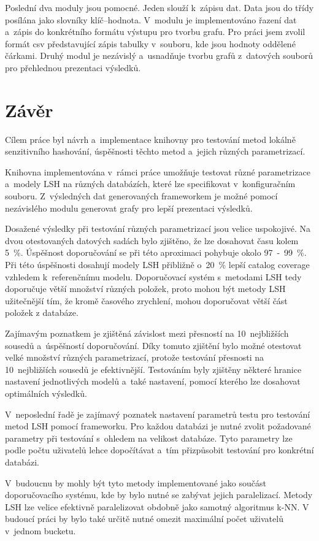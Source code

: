 \documentclass[11pt]{article}
\begin{document}
Poslední dva moduly jsou pomocné. Jeden slouží k~zápisu dat. Data jsou do třídy posílána jako slovníky klíč–hodnota. V~modulu je implementováno řazení dat a~zápis do konkrétního formátu výstupu pro tvorbu grafu. Pro práci jsem zvolil formát csv představující zápis tabulky v~souboru, kde jsou hodnoty oddělené čárkami. Druhý modul je nezávislý a~usnadňuje tvorbu grafů z~datových souborů pro přehlednou prezentaci výsledků.

\section{Závěr}
Cílem práce byl návrh a~implementace knihovny pro testování metod lokálně senzitivního hashování, úspěšnosti těchto metod a~jejich různých parametrizací.
	
	Knihovna implementována v~rámci práce umožňuje testovat různé parametrizace a~modely LSH na různých databázích, které lze specifikovat v~konfiguračním souboru. Z~výsledných dat generovaných frameworkem je možné pomocí nezávislého modulu generovat grafy pro lepší prezentaci výsledků.
	
	Dosažené výsledky při testování různých parametrizací jsou velice uspokojivé. Na dvou otestovaných datových sadách bylo zjištěno, že lze dosahovat času kolem 5~\%. Úspěšnost doporučování se při této aproximaci pohybuje okolo 97~-~99~\%. Při této úspěšnosti dosahují modely LSH přibližně o~20~\% lepší catalog coverage vzhledem k~referenčnímu modelu. Doporučovací systém s~metodami LSH tedy doporučuje větší množství různých položek, proto mohou být metody LSH užitečnější tím, že kromě časového zrychlení, mohou doporučovat větší část položek z databáze.
	
	Zajímavým poznatkem je zjištěná závislost mezi přesností na 10~nejbližších sousedů a~úspěšností doporučování. Díky tomuto zjištění bylo možné otestovat velké množství různých parametrizací, protože testování přesnosti na 10~nejbližších sousedů je efektivnější. Testováním byly zjištěny některé hranice nastavení jednotlivých modelů a~také nastavení, pomocí kterého lze dosahovat optimálních výsledků.
	
	V~neposlední řadě je zajímavý poznatek nastavení parametrů testu pro testování metod LSH pomocí frameworku. Pro každou databázi je nutné zvolit požadované parametry při testování s~ohledem na velikost databáze. Tyto parametry lze podle počtu uživatelů lehce dopočítávat a~tím přizpůsobit testování pro konkrétní databázi.
	
	V~budoucnu by mohly být tyto metody implementované jako součást doporučovacího systému, kde by bylo nutné se zabývat jejich paralelizací. Metody LSH lze velice efektivně paralelizovat obdobně jako samotný algoritmus k-NN. V budoucí práci by bylo také určitě nutné omezit maximální počet uživatelů v~jednom bucketu.
\end{document}
